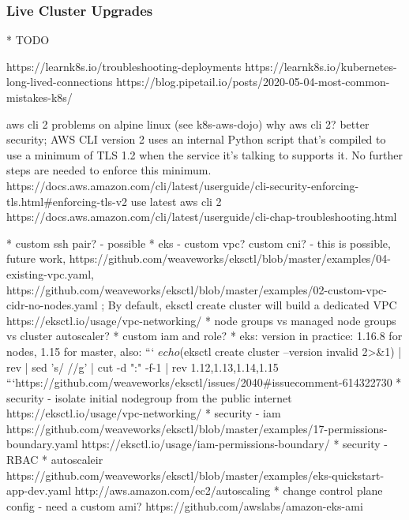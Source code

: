 \subsubsection{Live Cluster Upgrades}

* TODO

https://learnk8s.io/troubleshooting-deployments
https://learnk8s.io/kubernetes-long-lived-connections
https://blog.pipetail.io/posts/2020-05-04-most-common-mistakes-k8s/

aws cli 2 problems on alpine linux (see k8s-aws-dojo)
why aws cli 2? better security; AWS CLI version 2 uses an internal Python script that's compiled to use a minimum of TLS 1.2 when the service it's talking to supports it. No further steps are needed to enforce this minimum. https://docs.aws.amazon.com/cli/latest/userguide/cli-security-enforcing-tls.html#enforcing-tls-v2
 use latest aws cli 2 https://docs.aws.amazon.com/cli/latest/userguide/cli-chap-troubleshooting.html

* custom ssh pair? - possible
* eks - custom vpc? custom cni? - this is possible, future work, https://github.com/weaveworks/eksctl/blob/master/examples/04-existing-vpc.yaml, https://github.com/weaveworks/eksctl/blob/master/examples/02-custom-vpc-cidr-no-nodes.yaml ; By default, eksctl create cluster will build a dedicated VPC https://eksctl.io/usage/vpc-networking/
* node groups vs managed node groups vs cluster autoscaler?
* custom iam and role?
* eks: version in practice: 1.16.8 for nodes, 1.15 for master, also:
```
$ echo $(eksctl create cluster --version invalid 2>&1) | rev | sed 's/ //g' | cut -d ":" -f-1 | rev
1.12,1.13,1.14,1.15
```https://github.com/weaveworks/eksctl/issues/2040#issuecomment-614322730
* security - isolate initial nodegroup from the public internet https://eksctl.io/usage/vpc-networking/
* security - iam https://github.com/weaveworks/eksctl/blob/master/examples/17-permissions-boundary.yaml https://eksctl.io/usage/iam-permissions-boundary/
* security - RBAC
* autoscaleir https://github.com/weaveworks/eksctl/blob/master/examples/eks-quickstart-app-dev.yaml http://aws.amazon.com/ec2/autoscaling
* change control plane config - need a custom ami? https://github.com/awslabs/amazon-eks-ami


